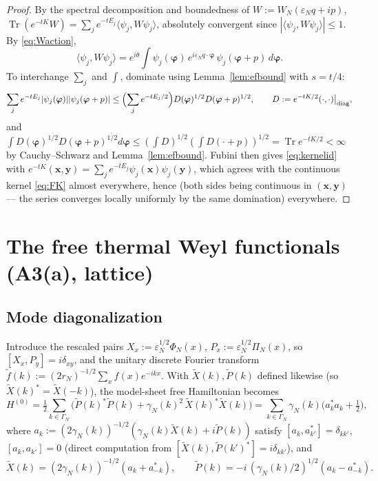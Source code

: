 \documentclass[11pt,a4paper]{article}
\theoremstyle{plain}
\theoremstyle{definition}
\newcommand{\eps}{\varepsilon}
\newcommand{\ip}[2]{\langle #1,#2\rangle}
\DeclareMathOperator{\Trace}{Tr}
\begin{document}
\begin{proof}
By the spectral decomposition and boundedness of $W:=W_N(\eps_Nq+ip)$,
$\Trace(e^{-tK}W)=\sum_je^{-tE_j}\ip{\psi_j}{W\psi_j}$, absolutely convergent
since $|\ip{\psi_j}{W\psi_j}|\le1$. By \eqref{eq:Waction},
\[
 \ip{\psi_j}{W\psi_j}
 =e^{i\theta}\int\psi_j(\bm\varphi)\,
 e^{i\eps_Nq\cdot\bm\varphi}\,\psi_j(\bm\varphi+p)\,d\bm\varphi .
\]
To interchange $\sum_j$ and $\int$, dominate using
Lemma~\ref{lem:efbound} with $s=t/4$:
\[
 \sum_je^{-tE_j}|\psi_j(\bm\varphi)||\psi_j(\bm\varphi+p)|
 \le\Bigl(\sum_je^{-tE_j/2}\Bigr)
 D(\bm\varphi)^{1/2}D(\bm\varphi+p)^{1/2},
 \qquad D:=e^{-tK/2}(\cdot,\cdot)\big|_{\rm diag},
\]
and $\int D(\bm\varphi)^{1/2}D(\bm\varphi+p)^{1/2}d\bm\varphi
\le(\int D)^{1/2}(\int D(\cdot+p))^{1/2}=\Trace e^{-tK/2}<\infty$ by
Cauchy--Schwarz and Lemma~\ref{lem:efbound}. Fubini then gives
\eqref{eq:kernelid} with
$e^{-tK}(\bm x,\bm y)=\sum_je^{-tE_j}\psi_j(\bm x)\psi_j(\bm y)$, which agrees
with the continuous kernel \eqref{eq:FK} almost everywhere, hence (both sides
being continuous in $(\bm x,\bm y)$ --- the series converges locally uniformly
by the same domination) everywhere.
\end{proof}

\section{The free thermal Weyl functionals (A3(a), lattice)}\label{sec:free}

\subsection{Mode diagonalization}

Introduce the rescaled pairs $X_x:=\eps_N^{1/2}\Phi_N(x)$,
$P_x:=\eps_N^{1/2}\Pi_N(x)$, so $[X_x,P_y]=i\delta_{xy}$, and the unitary
discrete Fourier transform
$\widetilde f(k):=(2r_N)^{-1/2}\sum_xf(x)e^{-ikx}$. With
$\widetilde X(k),\widetilde P(k)$ defined likewise (so
$\widetilde X(k)^*=\widetilde X(-k)$),
the model-sheet free Hamiltonian becomes
\[
 H^{(0)}=\tfrac12\sum_{k\in\Gamma_N}
 \bigl(\widetilde P(k)^*\widetilde P(k)
 +\gamma_N(k)^2\,\widetilde X(k)^*\widetilde X(k)\bigr)
 =\sum_{k\in\Gamma_N}\gamma_N(k)\bigl(a_k^*a_k+\tfrac12\bigr),
\]
where
$a_k:=(2\gamma_N(k))^{-1/2}(\gamma_N(k)\widetilde X(k)+i\widetilde P(k))$
satisfy $[a_k,a_{k'}^*]=\delta_{kk'}$, $[a_k,a_{k'}]=0$ (direct computation
from $[\widetilde X(k),\widetilde P(k')^*]=i\delta_{kk'}$), and
\begin{equation}
 \widetilde X(k)=(2\gamma_N(k))^{-1/2}(a_k+a_{-k}^*),\qquad
 \widetilde P(k)=-i\,(\gamma_N(k)/2)^{1/2}(a_k-a_{-k}^*).
 \label{eq:modes}
\end{equation}
\end{document}
